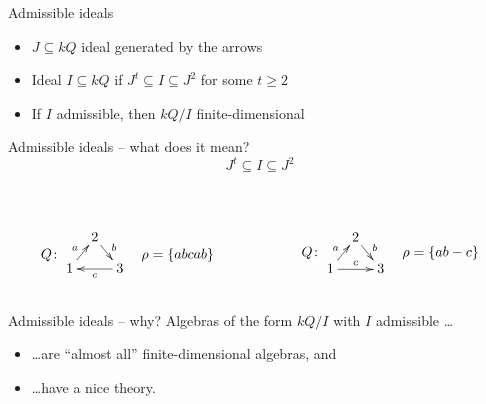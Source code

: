 \begin{frame}{Admissible ideals}
\begin{itemize}
\item $J \subseteq kQ$ ideal generated by the arrows
\item Ideal $I \subseteq kQ$  if $J^t \subseteq I
\subseteq J^2$ for some $t \ge 2$
\item If $I$ admissible, then $kQ/I$ finite-dimensional
\end{itemize}
\end{frame}


\begin{frame}{Admissible ideals -- what does it mean?}{}
{\huge
\[
J^t \subseteq I \subseteq J^2
\]
}
\pause
\vspace{-1em}
\begin{columns}
\begin{column}{.5\textwidth}
\\
\color{OliveGreen}
\[
Q\colon
\vcenter{\xymatrix@R=1em@C=.7em{
& 2 \ar[dr]^b \\
1 \ar[ur]^a &&
3 \ar[ll]^c
}}
\quad
\rho = \{ abcab \}
\]
\end{column}
\begin{column}{.5\textwidth}
\pause
\\
\color{red}
\[
Q\colon
\vcenter{\xymatrix@R=1em@C=.7em{
& 2 \ar[dr]^b \\
1 \ar[ur]^a \ar[rr]^c &&
3
}}
\quad
\rho = \{ ab - c \}
\]
\end{column}
\end{columns}
\end{frame}


\begin{frame}{Admissible ideals -- why?}
Algebras of the form $kQ/I$ with $I$ admissible \ldots
\begin{itemize}
\item \ldots are ``almost all'' finite-dimensional algebras, and
\item \ldots have a nice theory.
\end{itemize}
\end{frame}


